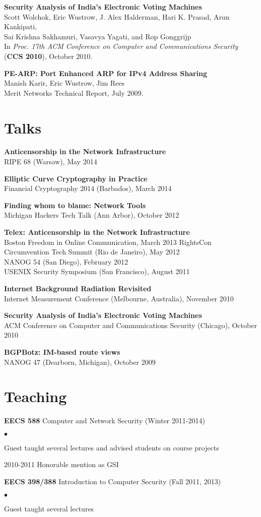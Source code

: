 \documentclass{res}
\newcommand{\sqitem}{\item[\tiny$\blacksquare$]}
\newcommand{\sqlist}{\begin{list}{$\bullet$}
  { \setlength{\itemsep}{0pt}
	\setlength{\parsep}{0pt}
	\setlength{\topsep}{0pt}
	\setlength{\partopsep}{0pt}
	\setlength{\leftmargin}{6.0em}
	\setlength{\labelsep}{2.5em} } }
\newcommand{\sqend}{\end{list}}
\begin{document}
\begin{resume}
	\textbf{Security Analysis of India's Electronic Voting  Machines} \\ 
	Scott Wolchok, Eric Wustrow, J. Alex Halderman, Hari K. Prasad, Arun Kankipati, \\
	Sai Krishna Sakhamuri, Vasavya Yagati, and Rop Gonggrijp \\
	In \emph{Proc. 17th ACM Conference on Computer and Communications 
	Security} \\
	(\textbf{CCS 2010}), October 2010.

	\textbf{PE-ARP: Port Enhanced ARP for IPv4 Address Sharing} \\
	Manish Karir, Eric Wustrow, Jim Rees \\
	Merit Networks Technical Report, July 2009.	

\section{Talks}

    \textbf{Anticensorship in the Network Infrastructure} \\
    RIPE 68 (Warsaw), May 2014

    \textbf{Elliptic Curve Cryptography in Practice} \\
    Financial Cryptography 2014 (Barbados), March 2014

    \textbf{Finding whom to blame: Network Tools} \\
    Michigan Hackers Tech Talk (Ann Arbor), October 2012

    \textbf{Telex: Anticensorship in the Network Infrastructure} \\
    Boston Freedom in Online Communication, March 2013
    RightsCon Circumvention Tech Summit (Rio de Janeiro), May 2012 \\
    NANOG 54 (San Diego), February 2012 \\
    USENIX Security Symposium (San Francisco), August 2011

    \textbf{Internet Background Radiation Revisited} \\
    Internet Measurement Conference (Melbourne, Australia), November 2010

    \textbf{Security Analysis of India's Electronic Voting Machines} \\
    ACM Conference on Computer and Communications Security (Chicago), October 2010

    \textbf{BGPBotz: IM-based route views} \\
    NANOG 47 (Dearborn, Michigan), October 2009

\section{Teaching}
    \textbf{EECS 588} Computer and Network Security (Winter 2011-2014)
        \sqlist
        \sqitem Guest taught several lectures and advised students on course projects
        \sqitem 2010-2011 Honorable mention as GSI
        \sqend

    \textbf{EECS 398/388} Introduction to Computer Security (Fall 2011, 2013)
        \sqlist
        \sqitem Guest taught several lectures
        \sqend


\end{resume}
\end{document}
